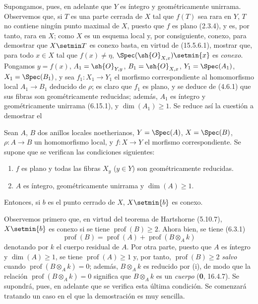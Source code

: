 \begin{env}[18.9.7.2]
\label{IV.18.9.7.2}
Supongamos, pues, en adelante que $Y$ es íntegro y geométricamente unirrama. Observemos que, si $T$ es una parte cerrada de $X$ tal que $f(T)$ sea rara en $Y$, $T$ no contiene ningún punto maximal de $X$, puesto que $f$ es plano (2.3.4), y es, por tanto, rara en $X$; como $X$ es un esquema local y, por consiguiente, conexo, para demostrar que $X\setmin T$ es conexo basta, en virtud de (15.5.6.1), mostrar que, para todo $x\in X$ tal que $f(x)\neq\eta$, $\Spec(\sh{O}_{X,x})\setmin\{x\}$ es \emph{conexo}. Pongamos $y=f(x)$, $A_1=\sh{O}_{Y,y}$, $B_1=\sh{O}_{X,x}$, $Y_1=\Spec(A_1)$, $X_1=\Spec(B_1)$, y sea $f_1:X_1\to Y_1$ el morfismo correspondiente al homomorfismo local $A_1\to B_1$ deducido de $\rho$; es claro que $f_1$ es plano, y se deduce de (4.6.1) que sus fibras son geométricamente reducidas; además, $A_1$ es íntegro y geométricamente unirrama (6.15.1), y $\dim(A_1)\geq 1$. Se reduce así la cuestión a demostrar el
\end{env}

\begin{lemma}[18.9.7.3]
\label{IV.18.9.7.3}
Sean $A$, $B$ dos anillos locales noetherianos, $Y=\Spec(A)$, $X=\Spec(B)$, $\rho:A\to B$ un homomorfismo local, y $f:X\to Y$ el morfismo correspondiente. Se supone que se verifican las condiciones siguientes:
\begin{enumerate}
  \item[\textup{(i)}] $f$ es plano y todas las fibras $X_y$ \textup{(}$y\in Y$\textup{)} son geométricamente reducidas.
  \item[\textup{(ii)}] $A$ es íntegro, geométricamente unirrama y $\dim(A)\geq 1$.
\end{enumerate}
Entonces, si $b$ es el punto cerrado de $X$, $X\setmin\{b\}$ es conexo.
\end{lemma}

Observemos primero que, en virtud del teorema de Hartshorne (5.10.7), $X\setmin\{b\}$ es conexo si se tiene $\operatorname{prof}(B)\geq 2$. Ahora bien, se tiene (6.3.1)
\begin{equation}
  \operatorname{prof}(B)=\operatorname{prof}(A)+\operatorname{prof}(B\otimes_A k)
  \tag{18.9.7.4}
  \label{IV.18.9.7.4}
\end{equation}
denotando por $k$ el cuerpo residual de $A$. Por otra parte, puesto que $A$ es íntegro y $\dim(A)\geq 1$, se tiene $\operatorname{prof}(A)\geq 1$ y, por tanto, $\operatorname{prof}(B)\geq 2$ \emph{salvo} cuando $\operatorname{prof}(B\otimes_A k)=0$; además, $B\otimes_A k$ es reducido por (i), de modo que la relación $\operatorname{prof}(B\otimes_A k)=0$ significa que $B\otimes_A k$ es un \emph{cuerpo} (\textbf 0, 16.4.7). Se supondrá, pues, en adelante que se verifica esta última condición. Se comenzará tratando un caso en el que la demostración es muy sencilla.

